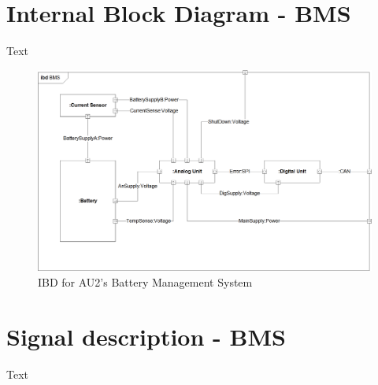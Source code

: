 \section{Internal Block Diagram - BMS}
Text

\begin{figure}[H]
	\centering
	\includegraphics[width=1\linewidth]{Architecture/Diagrams/IBD_BMS}
	\caption{IBD for AU2's Battery Management System}
	\label{fig:IBD_BMS}
\end{figure}

\section{Signal description - BMS}
Text